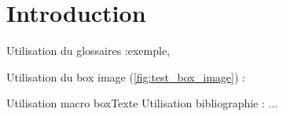 \chapter{Introduction}
    \lipsum[1]
    
    \vspace{2pt}
    Utilisation du glossaires :\gls{exemple}, 

    \vspace{2pt}
    Utilisation du box image (\ref{fig:test_box_image}) : 
    
    \vspace{2pt}
    Utilisation macro boxTexte  
    \vspace{2pt}
    Utilisation bibliographie : ...\cite{musicclassification:book}

    
